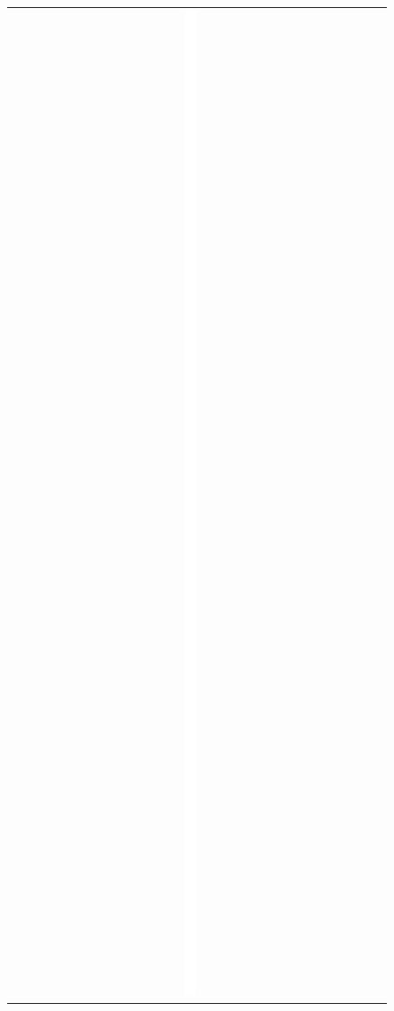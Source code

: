    \begin{figure}[!htbp]
     \centering
     \begin{tabular}{cc}
       \includegraphics[width=15cm]{figure/matrice.png} &
     \end{tabular}
     

\end{figure}
